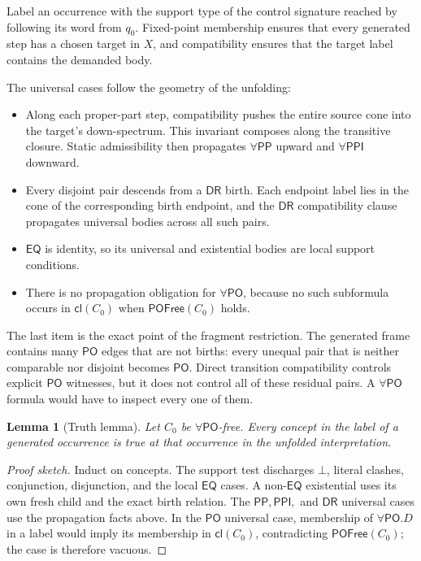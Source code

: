 \documentclass[11pt]{article}
\theoremstyle{plain}
\newtheorem{lemma}[theorem]{Lemma}
\theoremstyle{definition}
\theoremstyle{remark}
\newcommand{\EQ}{\ensuremath{\mathsf{EQ}}}
\newcommand{\PP}{\ensuremath{\mathsf{PP}}}
\newcommand{\PPI}{\ensuremath{\mathsf{PPI}}}
\newcommand{\PO}{\ensuremath{\mathsf{PO}}}
\newcommand{\DR}{\ensuremath{\mathsf{DR}}}
\newcommand{\cl}{\ensuremath{\mathsf{cl}}}
\newcommand{\POFree}{\ensuremath{\mathsf{POFree}}}
\begin{document}
Label an occurrence with the support type of the control signature reached by
following its word from $q_0$.  Fixed-point membership ensures that every
generated step has a chosen target in $X$, and compatibility ensures that the
target label contains the demanded body.

The universal cases follow the geometry of the unfolding:
\begin{itemize}
  \item Along each proper-part step, compatibility pushes the entire source
  cone into the target's down-spectrum.  This invariant composes along the
  transitive closure.  Static admissibility then propagates $\forall\PP$
  upward and $\forall\PPI$ downward.

  \item Every disjoint pair descends from a $\DR$ birth.  Each endpoint label
  lies in the cone of the corresponding birth endpoint, and the $\DR$
  compatibility clause propagates universal bodies across all such pairs.

  \item $\EQ$ is identity, so its universal and existential bodies are local
  support conditions.

  \item There is no propagation obligation for $\forall\PO$, because no such
  subformula occurs in $\cl(C_0)$ when $\POFree(C_0)$ holds.
\end{itemize}

The last item is the exact point of the fragment restriction.  The generated
frame contains many $\PO$ edges that are not births: every unequal pair that
is neither comparable nor disjoint becomes $\PO$.  Direct transition
compatibility controls explicit $\PO$ witnesses, but it does not control all
of these residual pairs.  A $\forall\PO$ formula would have to inspect every
one of them.

\begin{lemma}[Truth lemma]
\label{lem:truth}
Let $C_0$ be $\forall\PO$-free.  Every concept in the label of a generated
occurrence is true at that occurrence in the unfolded interpretation.
\end{lemma}

\begin{proof}[Proof sketch]
Induct on concepts.  The support test discharges $\bot$, literal clashes,
conjunction, disjunction, and the local $\EQ$ cases.  A non-$\EQ$ existential
uses its own fresh child and the exact birth relation.  The $\PP,\PPI,$ and
$\DR$ universal cases use the propagation facts above.  In the $\PO$
universal case, membership of $\forall\PO.D$ in a label would imply its
membership in $\cl(C_0)$, contradicting $\POFree(C_0)$; the case is therefore
vacuous.
\end{proof}
\end{document}
